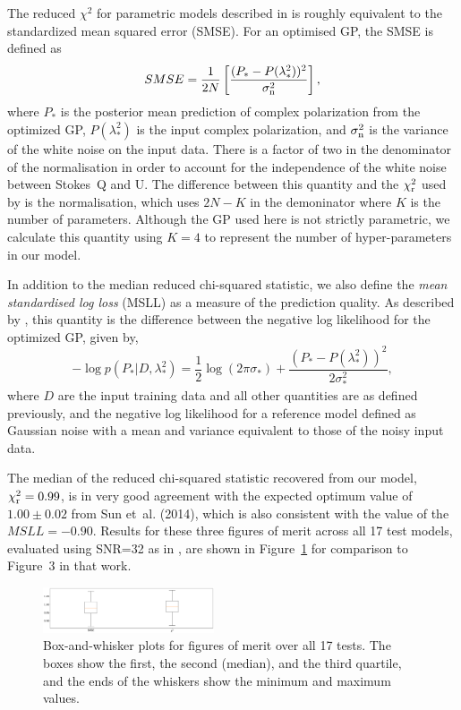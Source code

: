 \documentclass[fleqn,usenatbib]{mnras}
\begin{document}
The reduced $\chi^2$ for parametric models described in \cite{Sun_2015} is roughly equivalent to the standardized mean squared error (SMSE). For an optimised GP, the SMSE is defined as
%
\begin{equation}
SMSE = \frac{1}{2N}\left[ \frac{(P_{\ast} - P(\lambda^2_{\ast}))^2}{\sigma_{\rm n}^2}  \right],
\end{equation}
%
where $P_{\ast}$ is the posterior mean prediction of complex polarization from the optimized GP, $P(\lambda^2_{\ast})$ is the input complex polarization, and $\sigma_{\rm n}^2$ is the variance of the white noise on the input data. There is a factor of two in the denominator of the normalisation in order to account for the independence of the white noise between Stokes~Q and U. The difference between this quantity and the $\chi^2_{\rm r}$ used by \cite{Sun_2015} is the normalisation, which uses $2N-K$ in the demoninator where $K$ is the number of parameters. Although the GP used here is not strictly parametric, we calculate this quantity using $K=4$ to represent the number of hyper-parameters in our model. 

In addition to the median reduced chi-squared statistic, we also define the {\it mean standardised log loss} (MSLL) as a measure of the prediction quality. As described by \cite{3569}, this quantity is the difference between the negative log likelihood for the optimized GP, given by,
%
\begin{equation}
-\log p(P_{\ast} | D, \lambda^2_{\ast}) = \frac{1}{2}\log(2\pi \sigma_{\ast}) + \frac{(P_{\ast} - P(\lambda^2_{\ast}))^2}{2\sigma_{\ast}^2},
\end{equation}
%
where $D$ are the input training data and all other quantities are as defined previously, and the negative log likelihood for a reference model defined as Gaussian noise with a mean and variance equivalent to those of the noisy input data. 

The median of the reduced chi-squared statistic recovered from our model, $\chi^2_{\rm r} = 0.99$, is in very good agreement with the expected optimum value of $1.00\pm0.02$ from Sun et~al. (2014), which is also consistent with the value of the $MSLL= -0.90$. Results for these three figures of merit across all 17 test models, evaluated using SNR=32 as in \cite{Sun_2015}, are shown in Figure~\ref{fig:sunmetrics} for comparison to Figure~3 in that work. 
%
\begin{figure}
    \centering
    \includegraphics[width=0.45\textwidth]{./FIGURES/smse.png}
    \caption{Box-and-whisker plots for figures of merit over all 17 tests. The boxes show the first, the second (median), and the third quartile, and the ends of the whiskers show the minimum and maximum values.}
    \label{fig:sunmetrics}
\end{figure}
\end{document}
